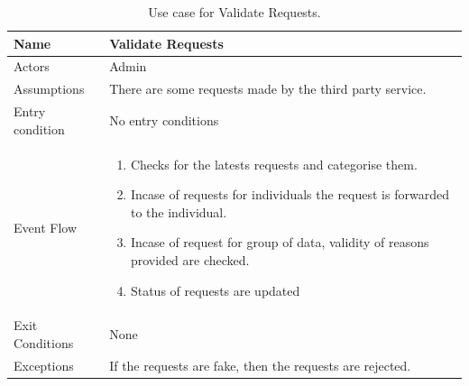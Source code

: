 
\begin{table}[H]
\begin{tabular}{| l | p{} |}
\hline
Name & Validate Requests\\
\hline
Actors & Admin\\
\hline
Assumptions & There are some requests made by the third party service.\\
\hline
Entry condition & No entry conditions\\
\hline
Event Flow & \begin{enumerate}
\item Checks for the latests requests and categorise them. 
\item Incase of requests for individuals the request is forwarded to the individual.
\item Incase of request for group of data, validity of reasons provided are checked. 
\item Status of requests are updated
\end{enumerate}
\\
\hline
Exit Conditions & None\\
\hline
Exceptions & If the requests are fake, then the requests are rejected. \\
\hline
\end{tabular}
\caption{Use case for Validate Requests.}
\label{usecase-validate-requests}
\end{table}

